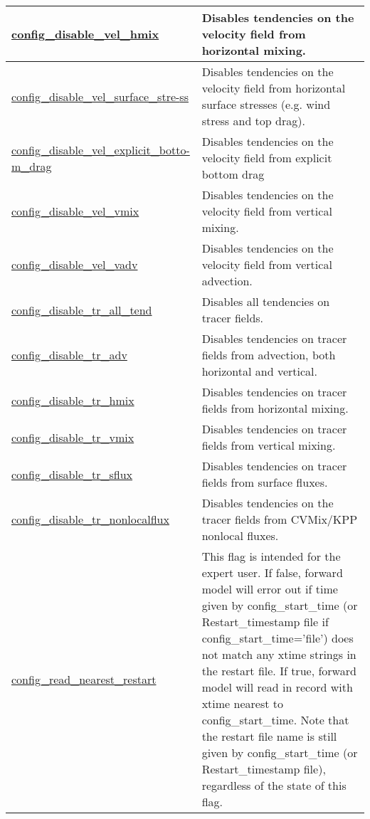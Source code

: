 {\begin{center}
\begin{longtable}{| p{2.0in} || p{4.0in} |}
    \hyperref[subsec:nm_sec_config_disable_vel_hmix]{config\_disable\_vel\_hmix} & Disables tendencies on the velocity field from horizontal mixing. \\
    \hline
    \hyperref[subsec:nm_sec_config_disable_vel_surface_stress]{config\_disable\_vel\_surface\_stre-}\hyperref[subsec:nm_sec_config_disable_vel_surface_stress]{ss}& Disables tendencies on the velocity field from horizontal surface stresses (e.g. wind stress and top drag). \\
    \hline
    \hyperref[subsec:nm_sec_config_disable_vel_explicit_bottom_drag]{config\_disable\_vel\_explicit\_botto-}\hyperref[subsec:nm_sec_config_disable_vel_explicit_bottom_drag]{m\_drag}& Disables tendencies on the velocity field from explicit bottom drag \\
    \hline
    \hyperref[subsec:nm_sec_config_disable_vel_vmix]{config\_disable\_vel\_vmix} & Disables tendencies on the velocity field from vertical mixing. \\
    \hline
    \hyperref[subsec:nm_sec_config_disable_vel_vadv]{config\_disable\_vel\_vadv} & Disables tendencies on the velocity field from vertical advection. \\
    \hline
    \hyperref[subsec:nm_sec_config_disable_tr_all_tend]{config\_disable\_tr\_all\_tend} & Disables all tendencies on tracer fields. \\
    \hline
    \hyperref[subsec:nm_sec_config_disable_tr_adv]{config\_disable\_tr\_adv} & Disables tendencies on tracer fields from advection, both horizontal and vertical. \\
    \hline
    \hyperref[subsec:nm_sec_config_disable_tr_hmix]{config\_disable\_tr\_hmix} & Disables tendencies on tracer fields from horizontal mixing. \\
    \hline
    \hyperref[subsec:nm_sec_config_disable_tr_vmix]{config\_disable\_tr\_vmix} & Disables tendencies on tracer fields from vertical mixing. \\
    \hline
    \hyperref[subsec:nm_sec_config_disable_tr_sflux]{config\_disable\_tr\_sflux} & Disables tendencies on tracer fields from surface fluxes. \\
    \hline
    \hyperref[subsec:nm_sec_config_disable_tr_nonlocalflux]{config\_disable\_tr\_nonlocalflux} & Disables tendencies on the tracer fields from CVMix/KPP nonlocal fluxes. \\
    \hline
    \hyperref[subsec:nm_sec_config_read_nearest_restart]{config\_read\_nearest\_restart} & This flag is intended for the expert user.  If false, forward model will error out if time given by config\_start\_time (or Restart\_timestamp file if config\_start\_time='file') does not match any xtime strings in the restart file.  If true, forward model will read in record with xtime nearest to config\_start\_time.  Note that the restart file name is still given by config\_start\_time (or Restart\_timestamp file), regardless of the state of this flag. \\
    \hline
\end{longtable}
\end{center}
}
